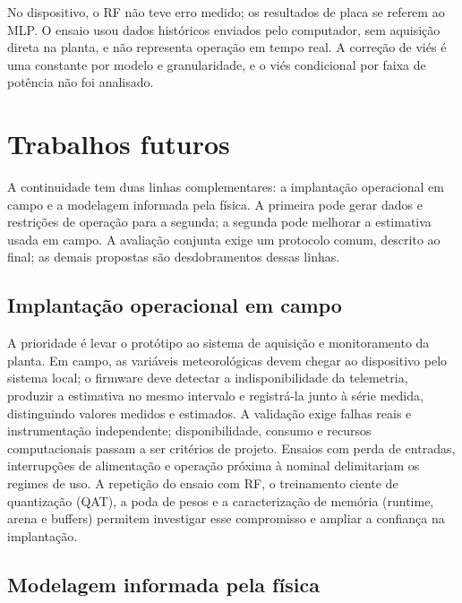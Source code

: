 No dispositivo, o RF não teve erro medido; os resultados de placa se referem ao
MLP. O ensaio usou dados históricos enviados pelo computador, sem aquisição
direta na planta, e não representa operação em tempo real. A correção de viés é
uma constante por modelo e granularidade, e o viés condicional por faixa de
potência não foi analisado.

\section{Trabalhos futuros}

A continuidade tem duas linhas complementares: a implantação operacional em campo
e a modelagem informada pela física. A primeira pode gerar dados e restrições de
operação para a segunda; a segunda pode melhorar a estimativa usada em campo. A
avaliação conjunta exige um protocolo comum, descrito ao final; as demais
propostas são desdobramentos dessas linhas.

\subsection{Implantação operacional em campo}
\label{sec:futuro-campo}

A prioridade é levar o protótipo ao sistema de aquisição e monitoramento da
planta. Em campo, as variáveis meteorológicas devem chegar ao dispositivo pelo
sistema local; o firmware deve detectar a indisponibilidade da telemetria,
produzir a estimativa no mesmo intervalo e registrá-la junto à série medida,
distinguindo valores medidos e estimados. A validação exige falhas reais e
instrumentação independente; disponibilidade, consumo e recursos computacionais
passam a ser critérios de projeto. Ensaios com perda de entradas, interrupções de
alimentação e operação próxima à nominal delimitariam os regimes de uso. A
repetição do ensaio com RF, o treinamento ciente de quantização (QAT), a poda de
pesos e a caracterização de memória (runtime, arena e buffers) permitem
investigar esse compromisso e ampliar a confiança na implantação.

\subsection{Modelagem informada pela física}
\label{sec:futuro-pinn}

